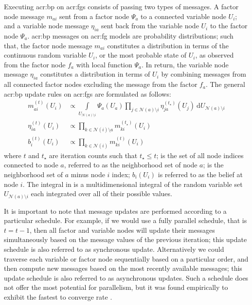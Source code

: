 Executing \gls{acr:bp} on \glspl{acr:fg} consists of passing two types of messages.
A factor node message $m_{ai}$ sent from a factor node $\Psi_a$ to a connected variable node $U_i$; and a variable node message $\eta_{ia}$ sent back from the variable node $U_i$ to the factor node $\Psi_a$.
\Gls{acr:bp} messages on \gls{acr:fg} models are probability distributions; such that, the factor node message $m_{ai}$ constitutes a distribution in terms of the continuous random variable $U_i$, or the most probable state of $U_i$, as observed from the factor node $f_a$ with local function $\Psi_a$.
In return, the variable node message $\eta_{ia}$ constitutes a distribution in terms of $U_i$ by combining messages from all connected factor nodes excluding the message from the factor $f_a$.
The general \gls{acr:bp} update rules on \glspl{acr:fg} are formulated as follows:
\begin{align}
	m_{ai}^{(t)}(U_{i}) & \propto \underset{U_{\mathcal{N}(a)\setminus i}}{\int}\Psi_{a}(U_{a})\prod_{j\in\mathcal{N}(a)\setminus i}\eta_{ja}^{(t_\star)}(U_{j})\ \mathrm{d} U_{\mathcal{N}(a)\setminus i} \label{eqn:genFNUM}\\
	\eta_{ia}^{(t)}(U_{i}) & \propto \prod_{k\in\mathcal{N}(i)\setminus a}m_{ki}^{(t_\star)}(U_{i}) \label{eqn:genVNUM}\\
	b_{i}^{(t)}(U_{i}) & \propto \prod_{k\in\mathcal{N}(i)}m_{ki}^{(t)}(U_{i}) \label{eqn:genB}
\end{align}
where $t$ and $t_\star$ are iteration counts such that $t_\star \leq t$;  is the set of all node indices connected to node $a$, referred to as the neighborhood set of node $a$;  is the neighborhood set of $a$ minus node $i$ index; $b_i(U_i)$ is referred to as the belief at node $i$.  
The integral in  is a multidimensional integral of the random variable set $U_{\mathcal{N}(a)\setminus i}$ each integrated over all of their possible values.


It is important to note that message updates are performed according to a particular schedule.
For example, if we would use a fully parallel schedule, that is $t = t - 1$, then all factor and variable nodes will update their messages simultaneously based on the message values of the previous iteration; this update schedule is also referred to as synchronous update.
Alternatively we could traverse each variable or factor node sequentially based on a particular order, and then compute new messages based on the most recently available messages; this update schedule is also referred to as asynchronous updates.
Such a schedule does not offer the most potential for parallelism, but it was found empirically to exhibit the fastest to converge rate \cite{bib:Elidan06ResidualBP}.

